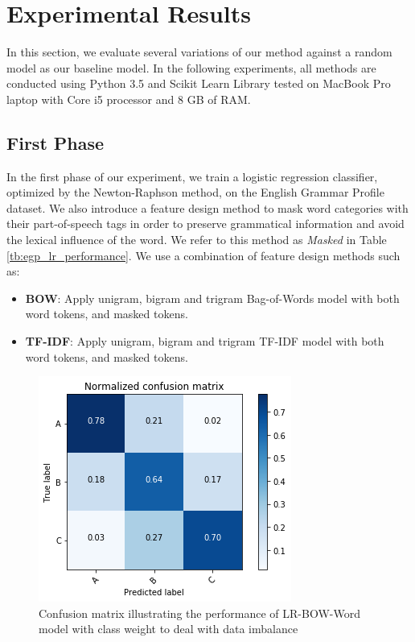 \section{Experimental Results}
\label{sec:exp}

In this section, we evaluate several variations of our method against a random model as our baseline model. In the following experiments, all methods are conducted using Python 3.5 and Scikit Learn Library tested on MacBook Pro laptop with Core i5 processor and 8 GB of RAM.

\subsection{First Phase}

In the first phase of our experiment, we train a logistic regression classifier, optimized by the Newton-Raphson method, on the English Grammar Profile dataset. We also introduce a  feature design method to mask word categories with their part-of-speech tags in order to preserve grammatical information and avoid the lexical influence of the word. We refer to this method as \emph{Masked} in Table \ref{tb:egp_lr_performance}. We use a combination of feature design methods such as:

\begin{itemize}
    \item \textbf{BOW}: Apply unigram, bigram and trigram Bag-of-Words model with both word tokens, and masked tokens.
    \item \textbf{TF-IDF}: Apply unigram, bigram and trigram TF-IDF model with both word tokens, and masked tokens.
\end{itemize}


\begin{figure}[t]
    \centering
    \includegraphics[width=.75\linewidth]{../Figures/conf_matrix_iter1.png} 
    \caption{Confusion matrix illustrating the performance of LR-BOW-Word model with class weight to deal with data imbalance}
    \label{fig:egp_confmat_LRBOW}
\end{figure}

